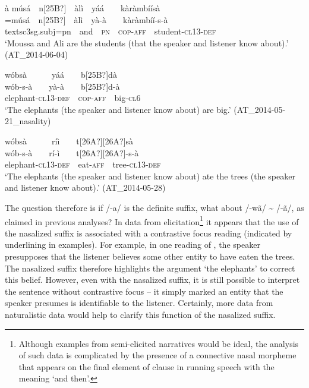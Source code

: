 \documentclass[output=paper]{langsci/langscibook}
\begin{document}
\ea\label{ex:teo:42}
\label{bkm:Ref264214207}à músá\ \ n[25B?]\ \ àlì\ \ yá\'{a}\ \ \ \ k\`{a}ràmb\'{i}\'{i}sà\\
\gll =músá\ \ n[25B?]\ \ àlì\ \ y\`{a}-\`{a}\ \ \ \ kàràmbí\'{i}-s-à \\
textsc{3sg.subj=pn}\ \ and\ \ \textsc{pn\ \ cop-aff}\ \ student\nobreakdash-\textsc{cl13-def} \\
\glt ‘Moussa and Ali are the students (that the speaker and listener know about).’ (AT\_2014-06-04)
\z

\ea\label{ex:teo:43}
w\'{o}bs\`{a}\ \ \ \ \ \ y\'{a}\'{a}\ \ \ \ b[25B?]d\`{a}\\
\gll w\'{o}b\nobreakdash-s\nobreakdash-\`{a}\ \ \ \ y\`{a}-\`{a}\ \ \ \ b[25B?]d\nobreakdash-\`{a}\\
elephant\nobreakdash-\textsc{cl13\nobreakdash-def\ \ cop-aff}\ \ big\nobreakdash-\textsc{cl6}\\
\glt ‘The elephants (the speaker and listener know about) are big.’ (AT\_2014-05-21\_nasality)
\z

\ea\label{ex:teo:44}
\label{bkm:Ref264214187}
w\'{o}bs\`{a}\ \ \ \ \ \ ríì\ \ \ \ t[26A?][26A?]sà\\
\gll w\'{o}b\nobreakdash-s\nobreakdash-\`{a}\ \ \ \ rí\nobreakdash-ì\ \ \ \ t[26A?][26A?]\nobreakdash-s\nobreakdash-à\\
elephant\nobreakdash-\textsc{cl13\nobreakdash-def}\ \ eat\nobreakdash-\textsc{aff\ \ }tree\nobreakdash-\textsc{cl13\nobreakdash-def}\\
\glt ‘The elephants (the speaker and listener know about) ate the trees (the speaker and listener know about).’ (AT\_2014-05-28)
\z

The question therefore is if /-a/ is the definite suffix, what about /-wã/ \~{} /-\~{a}/, as claimed in previous analyses? In data from elicitation\footnote{Although examples from semi-elicited narratives would be ideal, the analysis of such data is complicated by the presence of a connective nasal morpheme that appears on the final element of clause in running speech with the meaning ‘and then’.} it appears that the use of the nasalized suffix is associated with a contrastive focus reading (indicated by underlining in examples). For example, in one reading of , the speaker presupposes that the listener believes some other entity to have eaten the trees. The nasalized suffix therefore highlights the argument ‘the elephants’ to correct this belief. However, even with the nasalized suffix, it is still possible to interpret the sentence without contrastive focus – it simply marked an entity that the speaker presumes is identifiable to the listener. Certainly, more data from naturalistic data would help to clarify this function of the nasalized suffix.
\end{document}
